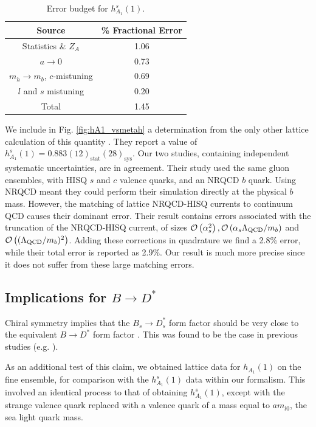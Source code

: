 \begin{table}
  \begin{center}
    \begin{tabular}{c c}
      \hline
      Source & \% Fractional Error \\ [0.5ex]
      \hline
      Statistics \& $Z_A$ & 1.06  \\ [1ex]
      $a\to 0$ & 0.73  \\ [1ex]
      $m_h \to m_b$, $c$-mistuning & 0.69 \\ [1ex]
      $l$ and $s$  mistuning & 0.20  \\ [1ex]
      \hline
      Total & 1.45 \\ [1ex]
      \hline
    \end{tabular}
  \end{center}
  \caption{Error budget for $h^s_{A_1}(1)$. \label{tab:errorbudget_BsDsstar}}
\end{table}

We include in Fig. \ref{fig:hA1_vsmetah} a determination from the only other lattice calculation of this quantity \cite{Harrison:2017fmw}. They report a value of $h_{A_1}^s(1) = 0.883(12)_{\text{stat}}(28)_{\text{sys}}$. Our two studies, containing independent systematic uncertainties, are in agreement. Their study used the same gluon ensembles, with HISQ $s$ and $c$ valence quarks, and an NRQCD $b$ quark. Using NRQCD meant they could perform their simulation directly at the physical $b$ mass. However, the matching of lattice NRQCD-HISQ currents to continuum QCD causes their dominant error. Their result contains errors associated with the truncation of the NRQCD-HISQ current, of sizes $\mathcal{O}\left( \alpha_s^2 \right),\mathcal{O}\left( \alpha_s \Lambda_{\text{QCD}}/m_b \right)$ and $\mathcal{O}\left( (\Lambda_{\text{QCD}}/m_b)^2 \right)$. Adding these corrections in quadrature we find a 2.8\% error, while their total error is reported as 2.9\%. Our result is much more precise since it does not suffer from these large matching errors.

\subsection{Implications for $B\to D^*$}

Chiral symmetry implies that the $B_s\to D_s^*$ form factor should be very close to the equivalent $B\to D^*$ form factor \cite{Laiho:2005ue}. This was found to be the case in previous studies (e.g. \cite{Harrison:2017fmw}). 

As an additional test of this claim, we obtained lattice data for $h_{A_1}(1)$ on the fine ensemble, for comparison with the $h_{A_1}^s(1)$ data within our formalism. This involved an identical process to that of obtaining $h_{A_1}^s(1)$, except with the strange valence quark replaced with a valence quark of a mass equal to $am_{l0}$, the sea light quark mass.

